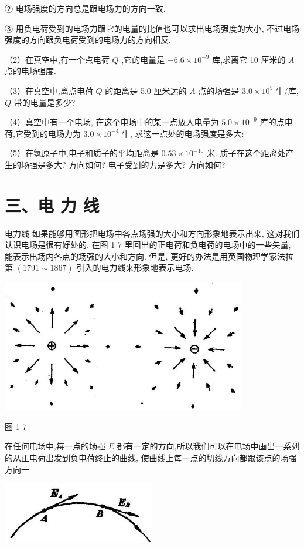 \documentclass[10pt]{article}
\begin{document}
② 电场强度的方向总是跟电场力的方向一致.

③ 用负电荷受到的电场力跟它的电量的比值也可以求出电场强度的大小, 不过电场强度的方向跟负电荷受到的电场力的方向相反.

（2）在真空中,有一个点电荷 \(Q\) ,它的电量是 \(- {6.6} \times {10}^{-9}\) 库,求离它 10 厘米的 \(A\) 点的电场强度.

（3）在真空中,离点电荷 \(Q\) 的距离是 5.0 厘米远的 \(A\) 点的场强是 \({3.0} \times {10}^{5}\) 牛/库, \(Q\) 带的电量是多少?

（4）真空中有一个电场, 在这个电场中的某一点放入电量为 \({5.0} \times {10}^{-9}\) 库的点电荷,它受到的电场力为 \({3.0} \times {10}^{-4}\) 牛, 求这一点处的电场强度是多大:

（5）在氢原子中,电子和质子的平均距离是 \({0.53} \times {10}^{-{10}}\) 米. 质子在这个距离处产生的场强是多大? 方向如何? 电子受到的力是多大? 方向如何?

\section*{三、电 力 线}

电力线 如果能够用图形把电场中各点场强的大小和方向形象地表示出来, 这对我们认识电场是很有好处的. 在图 1-7 里回出的正电荷和负电荷的电场中的一些矢量, 能表示出场内各点的场强的大小和方向. 但是, 更好的办法是用英国物理学家法拉第 \(\left( {{1791} \sim {1867}}\right)\) 引入的电力线来形象地表示电场.

\begin{center}
\includegraphics[max width=0.8\textwidth]{images/01913056-1f15-74d8-9184-9aab52c9d66b_22_112557.jpg}
\end{center}

图 1-7

在任何电场中,每一点的场强 \(E\) 都有一定的方向,所以我们可以在电场中画出一系列的从正电荷出发到负电荷终止的曲线, 使曲线上每一点的切线方向都跟该点的场强方向一

\begin{center}
\includegraphics[max width=0.5\textwidth]{images/01913056-1f15-74d8-9184-9aab52c9d66b_22_264528.jpg}
\end{center}
\end{document}
